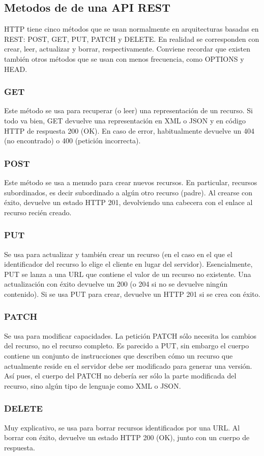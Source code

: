 \documentclass[titlepage]{article} %
\begin{document}
\subsection{Metodos de de una API REST}
HTTP tiene cinco métodos que se usan normalmente en arquitecturas basadas en REST: POST, GET, PUT, PATCH y DELETE. En realidad se corresponden con crear, leer, actualizar y borrar, respectivamente. Conviene recordar que existen también otros métodos que se usan con menos frecuencia, como OPTIONS y HEAD.
\subsubsection{GET}
Este método se usa para recuperar (o leer) una representación de un recurso. Si todo va bien, GET devuelve una representación en XML o JSON y en código HTTP de respuesta 200 (OK). En caso de error, habitualmente devuelve un 404 (no encontrado) o 400 (petición incorrecta).
\subsubsection{POST}
 Este método se usa a menudo para crear nuevos recursos. En particular, recursos subordinados, es decir subordinado a algún otro recurso (padre). Al crearse con éxito, devuelve un estado HTTP 201, devolviendo una cabecera con el enlace al recurso recién creado.
 \subsubsection{PUT}
 Se usa para actualizar y también crear un recurso (en el caso en el que el identificador del recurso lo elige el cliente en lugar del servidor). Esencialmente, PUT se lanza a una URL que contiene el valor de un recurso no existente. Una actualización con éxito devuelve un 200 (o 204 si no se devuelve ningún contenido). Si se usa PUT para crear, devuelve un HTTP 201 si se crea con éxito.
 \subsubsection{PATCH}
 Se usa para modificar capacidades. La petición PATCH sólo necesita los cambios del recurso, no el recurso completo. Es parecido a PUT, sin embargo el cuerpo contiene un conjunto de instrucciones que describen cómo un recurso que actualmente reside en el servidor debe ser modificado para generar una versión. Así pues, el cuerpo del PATCH no debería ser sólo la parte modificada del recurso, sino algún tipo de lenguaje como XML o JSON.
 \subsubsection{DELETE}
 Muy explicativo, se usa para borrar recursos identificados por una URL. Al borrar con éxito, devuelve un estado HTTP 200 (OK), junto con un cuerpo de respuesta.
\end{document}
